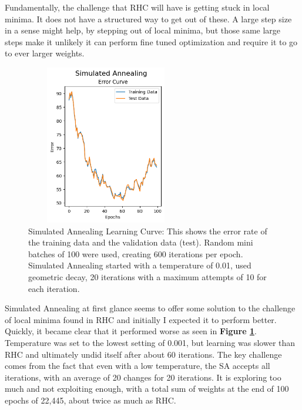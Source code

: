 \documentclass[letterpaper]{article} %
\begin{document}
Fundamentally, the challenge that RHC will have is getting stuck in local minima.  It does not have a structured way to get out of these.  A large step size in a sense might help, by stepping out of local minima, but those same large steps make it unlikely it can perform fine tuned optimization and require it to go to ever larger weights.   


\begin{figure}[!htb]
\centering
\includegraphics[width=2.75in, height=2.75in]{figures/Simulated_Annealing__algorithm_sa_epochs_100_temperature_0.01_decay_geom_max_iters_20_max_attempts_5_seed_1_.png}
\caption{Simulated Annealing Learning Curve: This shows the error rate of the training data and the validation data (test).  Random mini batches of 100 were used, creating 600 iterations per epoch.  Simulated Annealing started with a temperature of 0.01, used geometric decay,  20 iterations with a maximum attempts of 10 for each iteration.  }
\label{fig:nn_sa_initial}
\end{figure}

Simulated Annealing at first glance seems to offer some solution to the challenge of local minima found in RHC and initially I expected it to perform better.  Quickly, it became clear that it performed worse as seen in \textbf{Figure \ref{fig:nn_sa_initial}}.  Temperature was set to the lowest setting of 0.001, but learning was slower than RHC and ultimately undid itself after about 60 iterations.  The key challenge comes from the fact that even with a low temperature, the SA accepts all iterations, with an average of 20 changes for 20 iterations.  It is exploring too much and not exploiting enough, with a total sum of weights at the end of 100 epochs of 22,445, about twice as much as RHC. 
\end{document}
